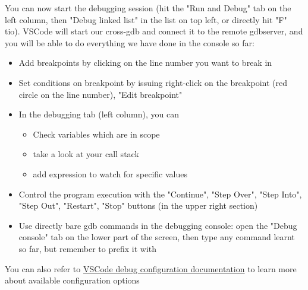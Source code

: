 You can now start the debugging session (hit the "Run and Debug"
tab on the left column, then "Debug linked list" in the list on top left, or
directly hit "F" tio).
VSCode will start our cross-gdb and connect it to the remote gdbserver, and you
will be able to do everything we have done in the console so far:
\begin{itemize}
  \item Add breakpoints by clicking on the line number you want to break in
  \item Set conditions on breakpoint by issuing right-click on the breakpoint
  (red circle on the line number), "Edit breakpoint"
  \item In the debugging tab (left column), you can
  \begin{itemize}
    \item Check variables which are in scope
    \item take a look at your call stack
    \item add expression to watch for specific values
  \end{itemize}
  \item Control the program execution with the "Continue", "Step Over", "Step
  Into", "Step Out", "Restart", "Stop" buttons (in the upper right section)
  \item Use directly bare gdb commands in the debugging console: open the
  "Debug console" tab on the lower part of the screen, then type any command
  learnt so far, but remember to prefix it with 
\end{itemize}

You can also refer to
\href{https://code.visualstudio.com/docs/editor/debugging}{VSCode debug
configuration documentation} to learn more about available configuration options
